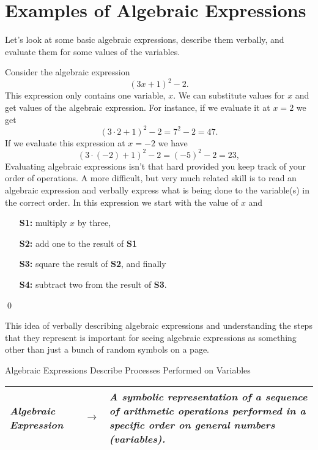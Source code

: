 \section{Examples of Algebraic Expressions}

Let's look at some basic algebraic expressions, describe them verbally, and evaluate them for some values of the variables.

\par

\begin{eg} Consider the algebraic expression
\[
(3x+1)^2-2.
\]
This expression only contains one variable, $x$. We can substitute values for $x$ and get values of the algebraic expression. For instance, if we evaluate it at $x=2$ we get
\[
(3\cdot 2+1)^2 -2 = 7^2-2 = 47.
\]
If we evaluate this expression at $x=-2$ we have
\[
(3\cdot(-2) +1)^2 -2 = (-5)^2 -2 = 23,
\]
Evaluating algebraic expressions isn't that hard provided you keep track of your order of operations. A more difficult, but very much related skill is to read an algebraic expression and verbally express what is being done to the variable(s) in the correct order. In this expression we start with the value of $x$ and
\begin{enumerate}
\item[\bf S1:] multiply $x$ by three,
\item[\bf S2:] add one to the result of {\bf S1}
\item[\bf S3:] square the result of {\bf S2}, and finally
\item[\bf S4:] subtract two from the result of {\bf S3}.  
\end{enumerate}
\qed
\end{eg}

This idea of verbally describing algebraic expressions and understanding the steps that they represent is important for seeing algebraic expressions as something other than just a bunch of random symbols on a page. 
\begin{center}
Algebraic Expressions Describe Processes Performed on Variables 
\begin{tabular}{|p{1.5in} c p{2.5in} |}
\hline\hline \it{Algebraic Expression} & $\longrightarrow$ & \it{A symbolic representation of a sequence  of arithmetic operations performed in a specific order on general numbers (variables).}\\
\hline
\end{tabular}
\end{center}

